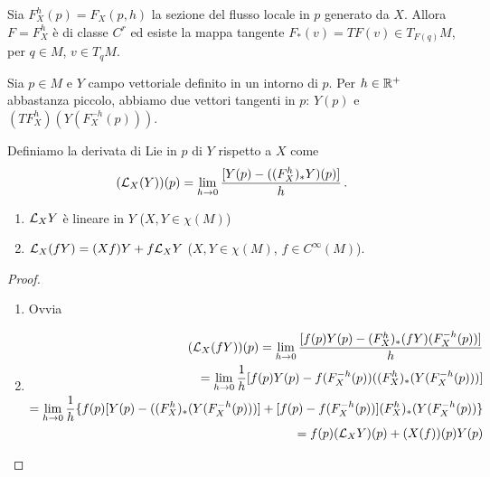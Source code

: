 Sia $F_X^h(p)=F_X(p,h)$ la sezione del flusso locale in $p$ generato da $X$. Allora $F=F_X^h$ è di classe $C^r$ ed esiste la mappa tangente $F_*(v)=TF(v)\in T_{F(q)}M$, per $q\in M$, $v\in T_qM$.

Sia $p\in M$ e $Y$ campo vettoriale definito in un intorno di $p$. Per $h\in\mathbb R^+$ abbastanza piccolo, abbiamo due vettori tangenti in $p$: $Y(p)$ e $(TF_X^h)(Y(F_X^{-h}(p)))$.

\begin{definition}
	Definiamo la derivata di Lie in $p$ di $Y$ rispetto a $X$ come \begin{equation*}(\mathcal L_X(Y))(p)=\lim_{h\to 0}\frac{[Y(p)-((F_X^h)_*Y)(p)]}h \, \text{. }
	\end{equation*}
\end{definition}

\begin{proposition}
	\begin{enumerate}
		\item $\mathcal L_XY$ è lineare in $Y$ ($X,Y\in\chi(M)$)
		\item $\mathcal L_X(fY)=(Xf)Y+f\mathcal L_XY$ ($X,Y\in\chi(M)$, $f\in C^\infty(M)$).
	\end{enumerate}
\end{proposition}

\begin{proof}
	\begin{enumerate}
	 \item Ovvia
	 \item 
	 \begin{align*}
	 (\mathcal L_X(fY))(p)=\lim_{h\to 0} \frac{[f(p)Y(p)-(F_X^h)_*(fY)(F_X^{-h}(p))]}h\\
	 =\lim_{h\to 0}\frac 1h [f(p)Y(p)-f(F_X^{-h}(p)) ((F_X^h)_*(Y(F_X^{-h}(p)))]\\
	 =\lim_{h\to 0}\frac 1h \{f(p)[Y(p)-((F_X^h)_*(Y(F_X^{-h}(p)))]+[f(p)-f(F_X^{-h}(p))](F_X^h)_*(Y(F_X^{-h}(p))\}\\
	 =f(p)(\mathcal L_XY)(p)+(X(f))(p)Y(p) 
	 \end{align*}
	 \end{enumerate}

\end{proof}




